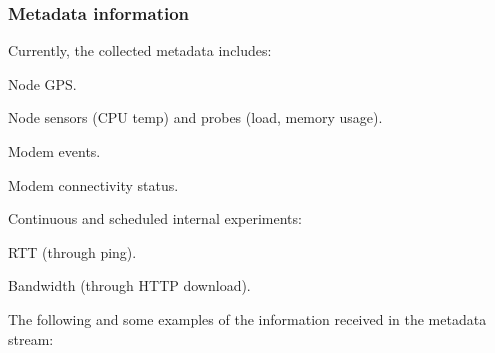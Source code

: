 \documentclass[a4paper,10pt]{article}
\begin{document}
\subsubsection{Metadata information}

Currently, the collected metadata includes:
\begin{itemize*}
	\item Node GPS.
	\item Node sensors (CPU temp) and probes (load, memory usage).
	\item Modem events.
	\item Modem connectivity status.
	\item Continuous and scheduled internal experiments:
	\begin{itemize*}
		\item RTT (through ping).
		\item Bandwidth (through HTTP download).
	\end{itemize*}
\end{itemize*}

The following and some examples of the information received in the metadata stream:
\end{document}
